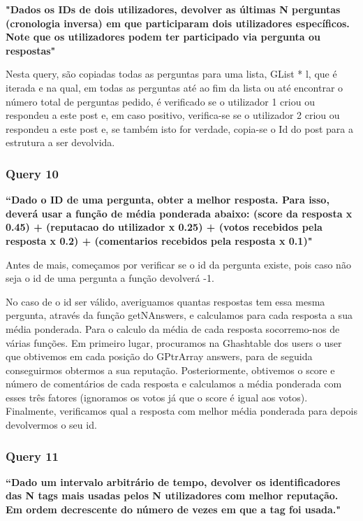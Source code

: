 \documentclass[a4paper]{article}
\begin{document}
\textbf{"Dados os IDs de dois utilizadores, devolver as últimas
N perguntas (cronologia inversa) em que participaram dois utilizadores específicos.
Note que os utilizadores podem ter participado via pergunta ou respostas"}

Nesta query, são copiadas todas as perguntas para uma lista, GList * l, que é iterada
e na qual, em todas as perguntas até ao fim da lista ou até encontrar o número total de
perguntas pedido, é verificado se o utilizador 1 criou ou respondeu a este post e, em
caso positivo, verifica-se se o utilizador 2 criou ou respondeu a este post e, se
também isto for verdade, copia-se o Id do post para a estrutura a ser devolvida.



\subsubsection*{Query 10}
\label{sec:query10}

\textbf{“Dado o ID de uma pergunta, obter a melhor resposta.
Para isso, deverá usar a função de média ponderada abaixo: (score da resposta x 0.45)
+ (reputacao do utilizador x 0.25) + (votos recebidos pela resposta x 0.2) +
(comentarios recebidos pela resposta x 0.1)"}

Antes de mais, começamos por verificar se o id da pergunta existe, pois caso não
seja o id de uma pergunta a função devolverá -1. \par
No caso de o id ser válido, averiguamos quantas respostas tem essa mesma pergunta,
através da função getNAnswers, e calculamos para cada resposta a sua média ponderada.
Para o calculo da média de cada resposta socorremo-nos de várias funções.
Em primeiro lugar, procuramos na Ghashtable dos users o user que obtivemos
em cada posição do GPtrArray answers, para de seguida conseguirmos obtermos
a sua reputação.
Posteriormente, obtivemos o score e número de comentários de cada resposta e calculamos
a média ponderada com esses três fatores (ignoramos os votos já que o score é
igual aos votos).
Finalmente, verificamos qual a resposta com melhor média ponderada para depois
devolvermos o seu id.


\subsubsection*{Query 11}
\label{sec:query11}

\textbf{“Dado um intervalo arbitrário de tempo, devolver os identificadores das N tags
mais usadas pelos N utilizadores com melhor reputação. Em ordem decrescente do número
de vezes em que a tag foi usada."}
\end{document}
